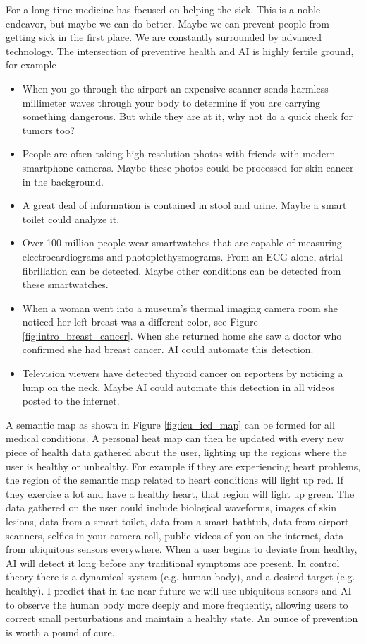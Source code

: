 For a long time medicine has focused on helping the sick.  This is a noble endeavor, but maybe we can do better.  Maybe we can prevent people from getting sick in the first place.  We are constantly surrounded by advanced technology.  The intersection of preventive health and AI is highly fertile ground, for example

\begin{itemize}
    \item When you go through the airport an expensive scanner sends harmless millimeter waves through your body to determine if you are carrying something dangerous.  But while they are at it, why not do a quick check for tumors too?
    \item People are often taking high resolution photos with friends with modern smartphone cameras.  Maybe these photos could be processed for skin cancer in the background.
    \item A great deal of information is contained in stool and urine.  Maybe a smart toilet could analyze it.
    \item Over 100 million people wear smartwatches that are capable of measuring electrocardiograms and photoplethysmograms.  From an ECG alone, atrial fibrillation can be detected.  Maybe other conditions can be detected from these smartwatches.
    \item When a woman went into a museum's thermal imaging camera room she noticed her left breast was a different color, see Figure \ref{fig:intro_breast_cancer}. When she returned home she saw a doctor who confirmed she had breast cancer.  AI could automate this detection.
    \item Television viewers have detected thyroid cancer on reporters by noticing a lump on the neck.  Maybe AI could automate this detection in all videos posted to the internet.
\end{itemize}

A semantic map as shown in Figure \ref{fig:icu_icd_map} can be formed for all medical conditions.  A personal heat map can then be updated with every new piece of health data gathered about the user, lighting up the regions where the user is healthy or unhealthy.  For example if they are experiencing heart problems, the region of the semantic map related to heart conditions will light up red.  If they exercise a lot and have a healthy heart, that region will light up green.  The data gathered on the user could include biological waveforms, images of skin lesions, data from a smart toilet, data from a smart bathtub, data from airport scanners, selfies in your camera roll, public videos of you on the internet, data from ubiquitous sensors everywhere.  When a user begins to deviate from healthy, AI will detect it long before any traditional symptoms are present.  In control theory there is a dynamical system (e.g. human body), and a desired target (e.g. healthy). I predict that in the near future we will use ubiquitous sensors and AI to observe the human body more deeply and more frequently, allowing users to correct small perturbations and maintain a healthy state.  An ounce of prevention is worth a pound of cure.